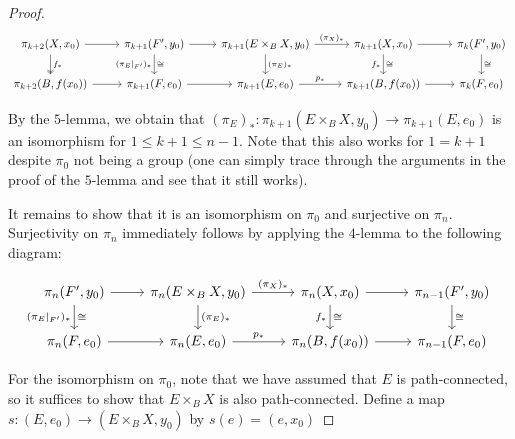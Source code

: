 \documentclass[reqno]{amsart}
\theoremstyle{definition}
\theoremstyle{remark}
\begin{document}
\begin{proof}
        \begin{equation*}
            \begin{tikzcd}
                \pi_{k+2}(X,x_0) \ar[d, "f_*", twoheadrightarrow]
                \ar[r] & \pi_{k+1}(F',y_0) \ar[r] \ar[d,
            "\cong", "(\pi_E|_{F'})_*"'] & 
            \pi_{k+1}(E \times_B X, y_0) \ar[r, "(\pi_X)_*"] 
            \ar[d, "(\pi_E)_*"] &
            \pi_{k+1}(X,x_0) \ar[r] \ar[d, "f_*"',
            "\cong"] & 
            \pi_k (F',y_0) \ar[d, "\cong"] \\
            \pi_{k+2} (B, f(x_0)) \ar[r] & \pi_{k+1}(F, e_0) \ar[r] & 
            \pi_{k+1}(E,e_0) \ar[r, "p_*"] &
            \pi_{k+1}(B,f(x_0)) \ar[r] &
            \pi_{k}(F,e_0)
        \end{tikzcd}
        \end{equation*}

        By the $5$-lemma, we
        obtain that
        $\left( \pi_E \right)_* \colon
        \pi_{k+1}(E \times_B X, y_0)
        \to \pi_{k+1}(E,e_0)$ is an isomorphism
        for $1 \le k+1 \le n-1$.
        Note that this also works
        for $1 = k+1$ despite $\pi_0$ not being
        a group (one can simply trace through the
        arguments in the proof of the $5$-lemma and
        see that it still works).



        It remains to show that it
        is an isomorphism on $\pi_0$ and
        surjective on $\pi_n$.
        Surjectivity on $\pi_n$ 
        immediately follows by applying the
        $4$-lemma to the following diagram:
        
        \begin{equation*}
            \begin{tikzcd}
               \pi_{n}(F',y_0) \ar[r] \ar[d,
            "\cong", "(\pi_E|_{F'})_*"'] & 
            \pi_{n}(E \times_B X, y_0) \ar[r, "(\pi_X)_*"] 
            \ar[d, "(\pi_E)_*"] &
            \pi_{n}(X,x_0) \ar[r] \ar[d, "f_*"',
            "\cong"] & 
            \pi_{n-1} (F',y_0) \ar[d, "\cong"] \\
            \pi_{n}(F, e_0) \ar[r] & 
            \pi_{n}(E,e_0) \ar[r, "p_*"] &
            \pi_{n}(B,f(x_0)) \ar[r] &
            \pi_{n-1}(F,e_0)
        \end{tikzcd}
        \end{equation*}

        For the isomorphism on
        $\pi_0$, note that we have
        assumed that $E$ is path-connected, so it
        suffices to show
        that $E \times_B X$ is also path-connected.
        Define a map $s \colon
        \left( E,e_0 \right) \to 
        \left( E \times_B X, y_0 \right) $ by
        $s (e) = (e,x_0)$
         









        
    \end{proof}
\end{document}
